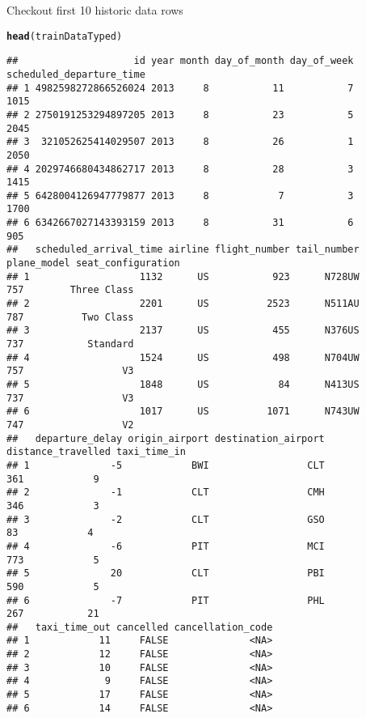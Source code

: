 \documentclass{article}\usepackage[]{graphicx}\usepackage[]{color}
\makeatletter
\newcommand{\hlstd}[1]{\textcolor[rgb]{0.345,0.345,0.345}{#1}}%
\newcommand{\hlkwd}[1]{\textcolor[rgb]{0.737,0.353,0.396}{\textbf{#1}}}%
\newenvironment{kframe}{%
 \def\at@end@of@kframe{}%
 \ifinner\ifhmode%
  \def\at@end@of@kframe{\end{minipage}}%
  \begin{minipage}{\columnwidth}%
 \fi\fi%
 \def\FrameCommand##1{\hskip\@totalleftmargin \hskip-\fboxsep
 \colorbox{shadecolor}{##1}\hskip-\fboxsep
     \hskip-\linewidth \hskip-\@totalleftmargin \hskip\columnwidth}%
 \MakeFramed {\advance\hsize-\width
   \@totalleftmargin\z@ \linewidth\hsize
   \@setminipage}}%
 {\par\unskip\endMakeFramed%
 \at@end@of@kframe}
\newenvironment{knitrout}{}{} %
\makeatother
\begin{document}
Checkout first 10 historic data rows
\begin{knitrout}
\color{fgcolor}\begin{kframe}
\begin{alltt}
\hlkwd{head}\hlstd{(trainDataTyped)}
\end{alltt}
\begin{verbatim}
##                    id year month day_of_month day_of_week scheduled_departure_time
## 1 4982598272866526024 2013     8           11           7                     1015
## 2 2750191253294897205 2013     8           23           5                     2045
## 3  321052625414029507 2013     8           26           1                     2050
## 4 2029746680434862717 2013     8           28           3                     1415
## 5 6428004126947779877 2013     8            7           3                     1700
## 6 6342667027143393159 2013     8           31           6                      905
##   scheduled_arrival_time airline flight_number tail_number plane_model seat_configuration
## 1                   1132      US           923      N728UW         757        Three Class
## 2                   2201      US          2523      N511AU         787          Two Class
## 3                   2137      US           455      N376US         737           Standard
## 4                   1524      US           498      N704UW         757                 V3
## 5                   1848      US            84      N413US         737                 V3
## 6                   1017      US          1071      N743UW         747                 V2
##   departure_delay origin_airport destination_airport distance_travelled taxi_time_in
## 1              -5            BWI                 CLT                361            9
## 2              -1            CLT                 CMH                346            3
## 3              -2            CLT                 GSO                 83            4
## 4              -6            PIT                 MCI                773            5
## 5              20            CLT                 PBI                590            5
## 6              -7            PIT                 PHL                267           21
##   taxi_time_out cancelled cancellation_code
## 1            11     FALSE              <NA>
## 2            12     FALSE              <NA>
## 3            10     FALSE              <NA>
## 4             9     FALSE              <NA>
## 5            17     FALSE              <NA>
## 6            14     FALSE              <NA>
\end{verbatim}
\end{kframe}
\end{knitrout}
\end{document}
